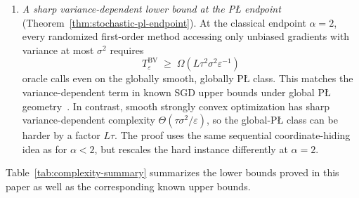 \documentclass[11pt]{article}
\begin{document}
\begin{enumerate}[label={\bf (\arabic*)},leftmargin=2.3em,itemsep=0.5em,topsep=0.3em]
\item
\emph{A sharp variance-dependent lower bound at the P\L{} endpoint}
(Theorem~\ref{thm:stochastic-pl-endpoint}). At the classical endpoint $\alpha=2$, every randomized first-order method
accessing only unbiased gradients with variance at most $\sigma^2$ requires
\[
T_\varepsilon^{\mathrm{BV}}
\;\ge\;
\Omega\left(L\tau^2\sigma^2\varepsilon^{-1}\right)
\]
oracle calls even on the globally smooth, globally P\L{} class. This matches the variance-dependent term in known SGD
upper bounds under global P\L{} geometry~\citep{FatkhullinEtesamiHeKiyavash2022}. In contrast, smooth strongly convex
optimization has sharp variance-dependent complexity $\Theta(\tau\sigma^2/\varepsilon)$, so the global-P\L{} class
can be harder by a factor $L\tau$. The proof uses the same sequential coordinate-hiding idea as for $\alpha<2$, but
rescales the hard instance differently at $\alpha=2$.

\end{enumerate}
\noindent
Table~\ref{tab:complexity-summary} summarizes the lower bounds proved in this paper as well as the corresponding known upper
bounds.
\end{document}
